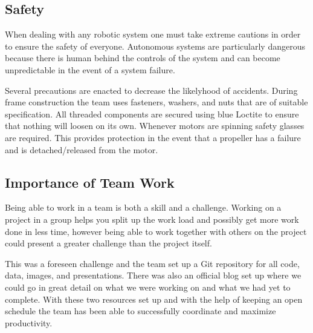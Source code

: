 \documentclass{article}
\numberwithin{equation}{section} %
\begin{document}

\subsection{Safety}

When dealing with any robotic system one must take extreme cautions in order to ensure the safety of everyone. Autonomous systems are particularly dangerous because there is human behind the controls of the system and can become unpredictable in the event of a system failure. 

Several precautions are enacted to decrease the likelyhood of accidents. During frame construction the team uses fasteners, washers, and nuts that are of suitable specification. All threaded components are secured using blue Loctite to ensure that nothing will loosen on its own. Whenever motors are spinning safety glasses are required. This provides protection in the event that a propeller has a failure and is detached/released from the motor.

\subsection{Importance of Team Work}
Being able to work in a team is both a skill and a challenge. Working on a project in a group helps you split up the work load and possibly get more work done in less time, however being able to work together with others on the project could present a greater challenge than the project itself. 

This was a foreseen challenge and the team set up a Git repository for all code, data, images, and presentations. There was also an official blog set up where we could go in great detail on what we were working on and what we had yet to complete. With these two resources set up and with the help of keeping an open schedule the team has been able to successfully coordinate and maximize productivity.
\end{document}
